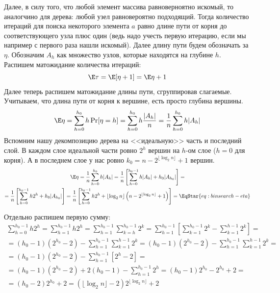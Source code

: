 Далее, в силу того, что любой элемент массива равноверноятно искомый, то аналогчино для дерева: любой узел равновероятно подходящий. 
Тогда количество итераций для поиска некоторого элемента $a$ равно длине пути от корня до соответствующего узла плюс один (ведь надо учесть первую итерацию, если мы например с первого раза нашли искомый).
Далее длину пути будем обозначать за $\eta$.
Обозначим $A_h$ как множество узлов, которые находятся на глубине $h$.
Распишем матожидание количества итераций:
\begin{equation*}
    \E \tau = \E [ \eta + 1 ] = \E \eta + 1
\end{equation*}
Далее теперь распишем матожидание длины пути, сгруппировав слагаемые. Учитываем, что длина пути от корня к вершине, есть просто глубина вершины.
\begin{equation*}
    \E \eta = \sum\limits_{h = 0}^{h_0} h \Pr[\eta = h] = \sum\limits_{h = 0}^{h_0} h \frac{|A_h|}{n} = \frac{1}{n} \sum\limits_{h = 0}^{h_0} h |A_h|
\end{equation*}
Вспомним нашу декомпозицию дерева на <<идеальную>> часть и последний слой. В каждом слое идеальной части ровно $2^h$ вершин на $h$-ом слое ($h = 0$ для корня).
А в последнем слое у нас ровно $k_0 = n - 2^{\lfloor \log_2 n \rfloor} + 1$ вершин.
\begin{multline*}
    \E \eta = \frac{1}{n} \sum\limits_{h = 0}^{h_0} h |A_h| = \frac{1}{n} \left[ \sum\limits_{h = 0}^{h_0 - 1} h |A_h| + h_0 |A_{h_0}| \right] = \\
    =  \frac{1}{n} \left[ \sum\limits_{h = 0}^{h_0 - 1} h 2^h + h_0 |A_{h_0}| \right] =  \frac{1}{n} \left[ \sum\limits_{h = 0}^{h_0 - 1} h 2^h + \lfloor \log_2 n \rfloor \left(n - 2^{\lfloor \log_2 n \rfloor} + 1\right) \right] = \EqStar{eq:binsearch-eta}
\end{multline*}

Отдельно распишем первую сумму:
\begin{multline*}
    \sum\limits_{h = 0}^{h_0 - 1} h 2^h = \sum\limits_{h = 1}^{h_0 - 1} h 2^h = \sum\limits_{h=1}^{h_0 - 1} \sum\limits_{k = h}^{h_0 - 1} 2^k = \sum\limits_{h=1}^{h_0 - 1} \left[\sum\limits_{k = 1}^{h_0 - 1} 2^k  - \sum\limits_{k = 1}^{h - 1} 2^k \right] = \\
    = (h_0 - 1) \left(2^{h_0} - 2\right) - \sum\limits_{h=1}^{h_0 - 1} \sum\limits_{k = 1}^{h - 1} 2^k = (h_0 - 1) \left(2^{h_0} - 2\right) - \sum\limits_{h=1}^{h_0 - 1} \sum\limits_{k = 1}^{h - 1} 2^k = \\
    = (h_0 - 1) \left(2^{h_0 } - 2\right) - \sum\limits_{h=1}^{h_0 - 1} \left[ 2^{h} - 2 \right] = \\
    = (h_0 - 1) \left(2^{h_0} - 2\right) + 2(h_0 - 1) - \sum\limits_{h=1}^{h_0 - 1} 2^{h} = (h_0 - 1) 2^{h_0} - 2^{h_0} + 2 = \\
    = (h_0  - 2) 2^{h_0} + 2 = \left( \lfloor \log_2 n \rfloor - 2 \right)2^{\lfloor \log_2 n \rfloor} + 2
\end{multline*}

